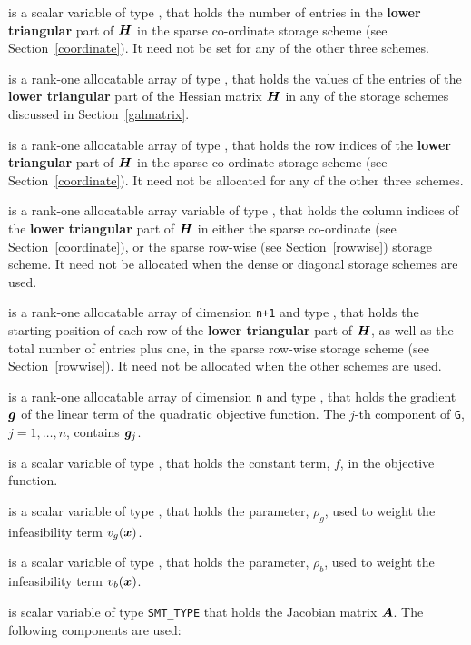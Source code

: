 \documentclass{galahad}
\begin{document}
\begin{description}
\begin{description}
 is a scalar variable of type \integer, that 
holds the number of entries in the {\bf lower triangular} part of ${\bm{H}}$
in the sparse co-ordinate storage scheme (see Section~\ref{coordinate}). 
It need not be set for any of the other three schemes.

 is a rank-one allocatable array of type \realdp, that holds
the values of the entries of the {\bf lower triangular} part
of the Hessian matrix ${\bm{H}}$ in any of the 
storage schemes discussed in Section~\ref{galmatrix}.

 is a rank-one allocatable array of type \integer,
that holds the row indices of the {\bf lower triangular} part of ${\bm{H}}$ 
in the sparse co-ordinate storage
scheme (see Section~\ref{coordinate}). 
It need not be allocated for any of the other three schemes.

 is a rank-one allocatable array variable of type \integer,
that holds the column indices of the {\bf lower triangular} part of 
${\bm{H}}$ in either the sparse co-ordinate 
(see Section~\ref{coordinate}), or the sparse row-wise 
(see Section~\ref{rowwise}) storage scheme.
It need not be allocated when the dense or diagonal storage schemes are used.

 is a rank-one allocatable array of dimension {\tt n+1} and type 
\integer, that holds the starting position of 
each row of the {\bf lower triangular} part of ${\bm{H}}$, as well
as the total number of entries plus one, in the sparse row-wise storage
scheme (see Section~\ref{rowwise}). It need not be allocated when the
other schemes are used.

\end{description}

 is a rank-one allocatable array of dimension {\tt n} and type 
\realdp, that holds the gradient ${\bm{g}}$ 
of the linear term of the quadratic objective function.
The $j$-th component of 
{\tt G}, $j = 1,  \ldots ,  n$, contains ${\bm{g}}_{j}$.

 is a scalar variable of type \realdp, that holds 
the constant term, $f$, in the objective function.

 is a scalar variable of type \realdp, that holds 
the parameter, $\rho_g$, used to weight the infeasibility term $v_g({\bm{x}})$.

 is a scalar variable of type \realdp, that holds 
the parameter, $\rho_b$, used to weight the infeasibility term $v_b({\bm{x}})$.

 is scalar variable of type {\tt SMT\_TYPE} 
that holds the Jacobian matrix ${\bm{A}}$. The following components are used:


\end{description}
\end{document}
